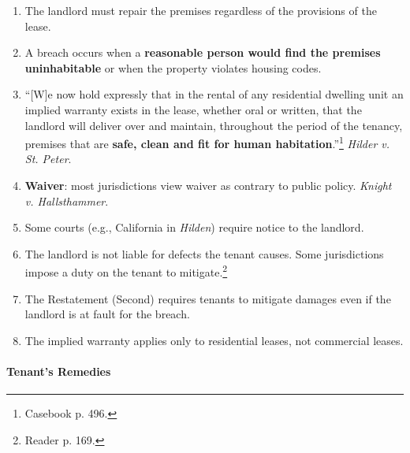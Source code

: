 \begin{enumerate}
    \item The landlord must repair the premises regardless of the provisions 
    of the lease.
    \item A breach occurs when a \textbf{reasonable person would find the 
    premises uninhabitable} or when the property violates housing codes.
    \item ``[W]e now hold expressly that in the rental of any residential 
    dwelling unit an implied warranty exists in the lease, whether oral or 
    written, that the landlord will deliver over and maintain, throughout the 
    period of the tenancy, premises that are \textbf{safe, clean and fit for 
    human habitation}.''\footnote{Casebook p. 496.} \emph{Hilder v. St. 
    Peter}.
    \item \textbf{Waiver}: most jurisdictions view waiver as contrary to 
    public policy. \emph{Knight v. Hallsthammer}.
    \item Some courts (e.g., California in \emph{Hilden}) require notice to 
    the landlord.
    \item The landlord is not liable for defects the tenant causes. Some 
    jurisdictions impose a duty on the tenant to mitigate.\footnote{Reader p. 
    169.}
    \item The Restatement (Second) requires tenants to mitigate damages even 
    if the landlord is at fault for the breach.
    \item The implied warranty applies only to residential leases, not 
    commercial leases.
\end{enumerate}

\paragraph{Tenant's Remedies}


